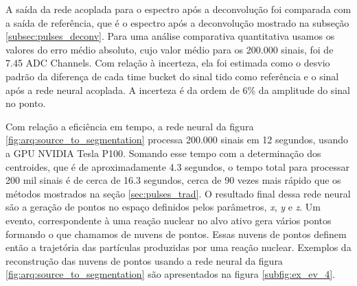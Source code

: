\documentclass[a4paper,12pt,oneside]{book}
\begin{document}
\par A saída da rede acoplada para o espectro após a deconvolução foi comparada com a saída de referência, que é o espectro após a deconvolução mostrado na subseção \ref{subsec:pulses_deconv}. Para uma análise comparativa quantitativa usamos os valores do erro médio absoluto, cujo valor médio para os 200.000 sinais, foi de 7.45 ADC Channels. Com relação à incerteza, ela foi estimada como o desvio padrão da diferença de cada time bucket do sinal tido como referência e o sinal após a rede neural acoplada. A incerteza é da ordem de 6\% da amplitude do sinal no ponto.

\par Com relação a eficiência em tempo, a rede neural da figura \ref{fig:arq:source_to_segmentation} processa 200.000 sinais em 12 segundos, usando a GPU NVIDIA Tesla P100. Somando esse tempo com a determinação dos centroides, que é de aproximadamente 4.3 segundos, o tempo total para processar 200 mil sinais é de cerca de 16.3 segundos, cerca de 90 vezes mais rápido que os métodos mostrados na seção \ref{sec:pulses_trad}. O resultado final dessa rede neural são a geração de pontos no espaço definidos pelos parâmetros, \textit{x}, \textit{y} e \textit{z}. Um evento, correspondente à uma reação nuclear no alvo ativo gera vários pontos formando o que chamamos de nuvens de pontos. Essas nuvens de pontos definem então a trajetória das partículas produzidas por uma reação nuclear. Exemplos da reconstrução das nuvens de pontos usando a rede neural da figura \ref{fig:arq:source_to_segmentation} são apresentados na figura \ref{subfig:ex_ev_4}.
\end{document}
